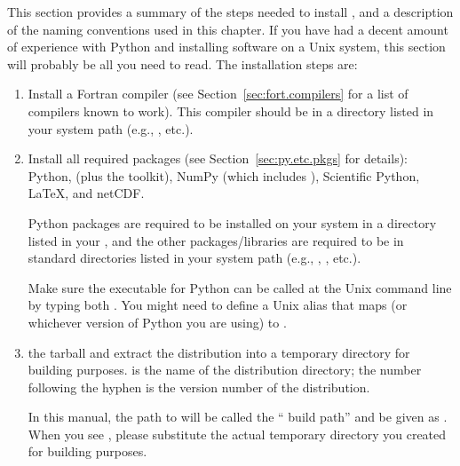 %


%

This section provides a summary of the steps needed to install
, and a description of the naming conventions used in
this chapter.  If you have had a decent amount of experience with
Python and installing software on a Unix system, this section will
probably be all you need to read.  The installation steps are:

\begin{enumerate}
\item Install a Fortran compiler (see Section~\ref{sec:fort.compilers}
	for a list of compilers known to work).
	This compiler should be in a directory
	listed in your system path (e.g., , etc.).

\item Install all required packages
	(see Section~\ref{sec:py.etc.pkgs} for details):
	Python,
	 (plus the  toolkit),
	NumPy (which includes ),
	Scientific Python,
	\LaTeX,
	and
	netCDF.

	Python packages are required to be installed on your
	system in a directory listed in your ,
	and the other packages/libraries are required to be in 
	standard directories listed in your system path 
	(e.g., , , etc.).

	Make sure the executable for Python can be called at the
	Unix command line by typing both .
	You might need to define a Unix alias
	that maps  (or whichever version of Python
	you are using) to .

\item {}%
        {}
	the  tarball and extract the distribution
	into a temporary directory for building purposes.
	\fn{}is the name of
	the  distribution directory;
	the number following the hyphen is the
	version number of the distribution.  \label{list:download.qtcm.sum}

	In this manual, the path to \fn{}will
	be called the `` build path'' and be given as
	.  When you see , please substitute
	the actual temporary directory you created for building purposes.


\end{enumerate}
